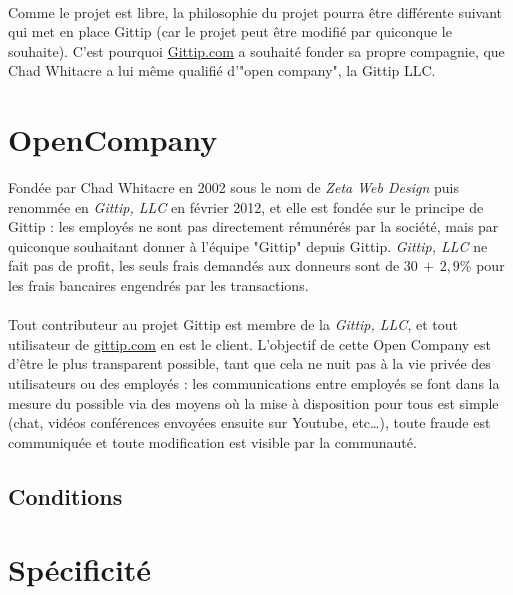 \paragraph{}
Comme le projet est libre, la philosophie du projet pourra être différente
suivant qui met en place Gittip (car le projet peut être modifié par
quiconque le souhaite). C'est pourquoi \url{Gittip.com} a souhaité fonder
sa propre compagnie, que Chad Whitacre a lui même qualifié d'"open company",
la Gittip LLC.


    \section{OpenCompany}

Fondée par Chad Whitacre en 2002 sous le nom de \emph{Zeta Web Design}
puis renommée en \emph{Gittip, LLC} en février 2012, et elle est fondée sur
le principe de Gittip : les employés ne sont pas directement rémunérés
par la société, mais par quiconque souhaitant donner à l'équipe "Gittip"
depuis Gittip. \emph{Gittip, LLC} ne fait pas de profit, les seuls frais
demandés aux donneurs sont de $30$\textcent $\, + \, 2,9\%{}$ pour les frais
bancaires engendrés par les transactions.

\paragraph{}
Tout contributeur au projet Gittip est membre de la \emph{Gittip, LLC},
et tout utilisateur de \url{gittip.com} en est le client. L'objectif de cette
Open Company est d'être le plus transparent possible, tant que cela ne nuit
pas à la vie privée des utilisateurs ou des employés : les communications
entre employés se font dans la mesure du possible via des moyens où la mise
à disposition pour tous est simple (chat, vidéos conférences envoyées ensuite
sur Youtube, etc\ldots), toute fraude est communiquée et toute modification
est visible par la communauté.


    \subsection{Conditions}

    \section{Spécificité}
